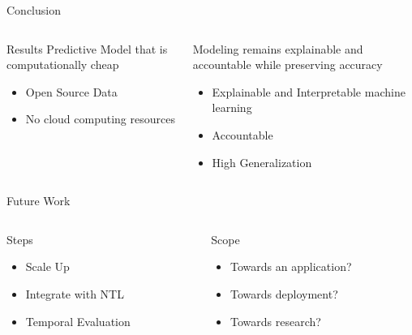 \documentclass[t]{beamer}
\begin{document}
\begin{frame}{Conclusion}
	\begin{columns}[T,totalwidth=\textwidth]
  		\begin{column}{0.45\textwidth}
  			\begin{block}{Results}
    				Predictive Model that is computationally cheap
    				\begin{itemize}
    				    \item Open Source Data
    				    \item No cloud computing resources
    				\end{itemize}  
			\end{block}
  		\end{column} %
  		\begin{column}{0.45\textwidth}
  			\begin{block}{}
    				Modeling remains explainable and accountable while preserving accuracy
    				\begin{itemize}
    				    \item Explainable and Interpretable machine learning
    				    \item Accountable
    				    \item High Generalization
    				
    				\end{itemize}  
			\end{block}
  		\end{column}%
	\end{columns}
\end{frame}
\begin{frame}{Future Work}
	\begin{columns}[T,totalwidth=\textwidth]
  		\begin{column}{0.45\textwidth}
  			\begin{block}{Steps}
    				\begin{itemize}
    				    \item Scale Up
    				    \item Integrate with NTL
    				    \item Temporal Evaluation
    				\end{itemize}  
			\end{block}
  		\end{column} %
  		\begin{column}{0.45\textwidth}
  		  	\begin{block}{Scope}
    			\begin{itemize}
    			    \item Towards an application?
    			    \item Towards deployment?
    				\item Towards research?
    				\end{itemize}  
			\end{block}
  		\end{column}%
	\end{columns}
    
\end{frame}
\end{document}
